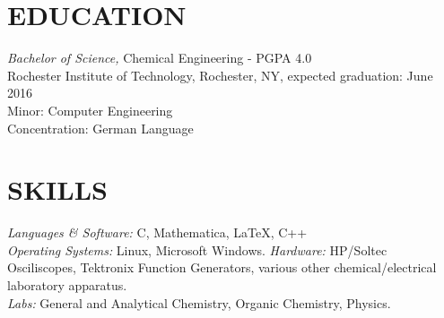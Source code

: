 \documentclass[line,margin]{res}
\begin{document}
\address{3241 Nathaniel Rochester Hall, Rochester, NY 14623}
\address{(315) 391-7268 - tmw4661@rit.edu}

\begin{resume}
 
\section{EDUCATION} {\sl Bachelor of Science,} Chemical Engineering - PGPA 4.0 \\
                Rochester Institute of Technology, Rochester, NY, 
                expected graduation: June 2016 \\
                Minor: Computer Engineering \\
                Concentration: German Language \\
\section{SKILLS} {\sl Languages \& Software:} C, Mathematica,
						\LaTeX, C++\\
                {\sl Operating Systems:} Linux, Microsoft Windows.
				{\sl Hardware:} HP/Soltec Osciliscopes, Tektronix Function Generators, various other chemical/electrical laboratory apparatus.\\
				{\sl Labs:} General and Analytical Chemistry, Organic Chemistry, Physics.


\end{resume}
\end{document}
